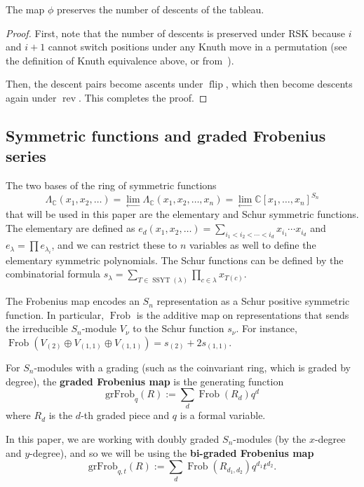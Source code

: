 \documentclass[ALCO,Unicode]{cedram}
\DeclareMathOperator{\flip}{flip}
\DeclareMathOperator{\Frob}{Frob}
\DeclareMathOperator{\rev}{rev}
\DeclareMathOperator{\SSYT}{SSYT}
\newcommand{\grFrob}{\mathrm{grFrob}}
\begin{document}
\begin{lemma}
	The map $\phi$ preserves the number of descents of the tableau.
\end{lemma}

\begin{proof}
	First, note that the number of descents is preserved under RSK because $i$ and $i+1$ cannot switch positions under any Knuth move in a permutation (see the definition of Knuth equivalence above, or from~\cite{Fulton}).
	
	Then, the descent pairs become ascents under $\flip$, which then become descents again under $\rev$.  This completes the proof.
\end{proof}

\subsection{Symmetric functions and graded Frobenius series}\label{sec:Frobenius}

The two bases of the ring of symmetric functions $$\Lambda_{\mathbb{C}}(x_1,x_2,\ldots)=\lim_{\leftarrow} \Lambda_{\mathbb{C}}(x_1,x_2,\ldots,x_n)=\lim_{\leftarrow}\mathbb{C}[x_1,\ldots,x_n]^{S_n}$$ that will be used in this paper are the elementary and Schur symmetric functions.  The elementary are defined as $e_d(x_1,x_2,\ldots)=\sum_{i_1<i_2<\cdots < i_d} x_{i_1}\cdots x_{i_d}$ and $e_\lambda=\prod e_{\lambda_i}$, and we can restrict these to $n$ variables as well to define the elementary symmetric polynomials.  The Schur functions can be defined by the combinatorial formula $s_\lambda=\sum_{T\in \SSYT(\lambda)}\prod_{c \in \lambda} x_{T(c)}$.

The Frobenius map encodes an $S_n$ representation as a Schur positive symmetric function.  In particular, $\Frob$ is the additive map on representations that sends the irreducible $S_n$-module $V_\nu$ to the Schur function $s_\nu$.  For instance, $\Frob(V_{(2)}\oplus V_{(1,1)}\oplus V_{(1,1)})=s_{(2)}+2s_{(1,1)}$.

For $S_n$-modules with a grading (such as the coinvariant ring, which is graded by degree), the \textbf{graded Frobenius map} is the generating function $$\grFrob_q(R):=\sum_d \Frob(R_d)q^d$$ where $R_d$ is the $d$-th graded piece and $q$ is a formal variable.

In this paper, we are working with doubly graded $S_n$-modules (by the $x$-degree and $y$-degree), and so we will be using the \textbf{bi-graded Frobenius map} $$\grFrob_{q,t}(R):=\sum_d \Frob(R_{d_1,d_2})q^{d_1}t^{d_2}.$$
\end{document}
